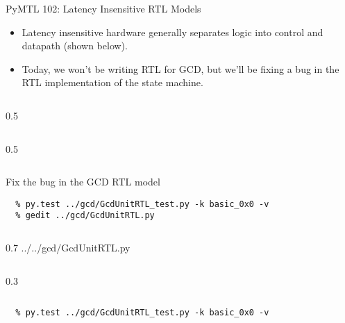 \begin{frame}{PyMTL 102: Latency Insensitive RTL Models}

\begin{itemize}
  \item Latency insensitive hardware generally separates logic into
        control and datapath (shown below).
  \smallskip
  \item Today, we won't be writing RTL for GCD, but we’ll be fixing a bug
        in the RTL implementation of the state machine.
\end{itemize}

  \vspace{0.1in}
  \begin{cbxcols}
  \begin{column}{0.5\tw}
  \end{column}
  \begin{column}{0.5\tw}
  \end{column}
  \end{cbxcols}
\end{frame}

\begin{task}\begin{frame}[fragile]{Fix the bug in the GCD RTL model}

\vspace{-0.15in}
\begin{Verbatim}[commandchars=\\\{\}]
  % cd \midtilde/pymtl-tut/build
  % py.test ../gcd/GcdUnitRTL_test.py -k basic_0x0 -v
  % gedit ../gcd/GcdUnitRTL.py
\end{Verbatim}
\vspace{-0.15in}

  \begin{cbxcols}
  \begin{column}{0.7\tw}
%
{../../gcd/GcdUnitRTL.py}
  \end{column}
  \begin{column}{0.3\tw}
  \vspace{.4in}
  \end{column}
  \end{cbxcols}

\vspace{-0.22in}
\begin{verbatim}
  % py.test ../gcd/GcdUnitRTL_test.py -k basic_0x0 -v
\end{verbatim}
\end{frame}
\end{task}

